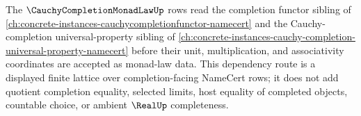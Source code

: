 The $\CauchyCompletionMonadLawUp$ rows read the completion functor sibling of \autoref{ch:concrete-instances-cauchycompletionfunctor-namecert} and the Cauchy-completion universal-property sibling of \autoref{ch:concrete-instances-cauchy-completion-universal-property-namecert} before their unit, multiplication, and associativity coordinates are accepted as monad-law data. This dependency route is a displayed finite lattice over completion-facing NameCert rows; it does not add quotient completion equality, selected limits, host equality of completed objects, countable choice, or ambient $\RealUp$ completeness.
